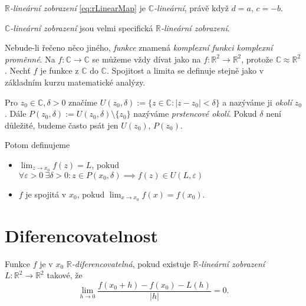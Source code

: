\begin{observation}
$\mathbb{R}$\emph{-lineární zobrazení} \cref{eq:rLinearMap} je $\mathbb{C}$\emph{-lineární}, právě když $d = a$, $ c = -b$.
\end{observation} 

\begin{note}
$\mathbb{C}$\emph{-lineární zobrazení} jsou velmi specifická $\mathbb{R}$\emph{-lineární zobrazení}.
\end{note}

\begin{agreement}
Nebude-li řečeno něco jiného, \emph{funkce} znamená \emph{komplexní funkci komplexní proměnné}. Na $f: \mathbb{C} \to \mathbb{C}$ se můžeme vždy dívat jako na $f: \mathbb{R}^2 \to \mathbb{R}^2$, protože $\mathbb{C}\approx\mathbb{R}^2$.
Nechť $f$ je funkce z $\mathbb{C}$ do $\mathbb{C}$. Spojitost a limita se definuje stejně jako v základním kurzu matematické analýzy.
\end{agreement}
\begin{definition}
Pro $z_0\in\mathbb{C}, \delta>0$ značíme $U(z_0,\delta):= \{z\in\mathbb{C}: |z-z_0|<\delta\}$ a nazýváme ji \emph{okolí} $z_0$. Dále $P(z_0,\delta):= U(z_0,\delta)\setminus\{z_0\}$ nazýváme \emph{prstencové okolí}. Pokud $\delta$ není důležité, budeme často psát jen $U(z_0)$, $P(z_0)$.

Potom definujeme
\begin{itemize}
    \item $\lim_{z\to x_0} {f(z)} = L$, pokud $\forall\varepsilon>0\ \exists\delta>0:z\in P(x_0,\delta)\implies f(z)\in U(L, \varepsilon)$
    \item $f$ je spojitá v $x_0$, pokud $\lim_{x\to x_0}{f(x)} = f(x_0)$.
\end{itemize}
\end{definition} 


\section{Diferencovatelnost}
\begin{definition}
Funkce $f$ je v $x_0$ $\mathbb{R}$\emph{-diferencovatelná}, pokud existuje $\mathbb{R}$\emph{-lineární zobrazení} \\$L: \mathbb{R}^2\to\mathbb{R}^2$ takové, že
$$\lim_{h\to 0}\frac{f(x_0+h)-f(x_0)-L(h)}{|h|} = 0.$$
\end{definition} 

